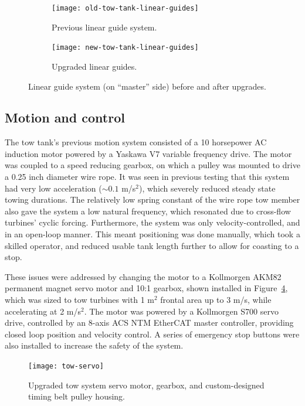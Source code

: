 \begin{figure}
    \centering
    
    \begin{subfigure}{0.47\textwidth}
        \texttt{[image: old-tow-tank-linear-guides]}
        \caption{Previous linear guide system.}
        \label{fig:old-linear-guides}
    \end{subfigure}
    \begin{subfigure}{0.47\textwidth}
        \texttt{[image: new-tow-tank-linear-guides]}
        \caption{Upgraded linear guides.}
        \label{fig:new-linear-guides}
    \end{subfigure}
    
    \caption{Linear guide system (on ``master'' side) before and after
        upgrades.}
\end{figure}


\subsection{Motion and control}

The tow tank's previous motion system consisted of a 10 horsepower AC induction
motor powered by a Yaskawa V7 variable frequency drive. The motor was coupled to
a speed reducing gearbox, on which a pulley was mounted to drive a 0.25 inch
diameter wire rope. It was seen in previous testing that this system had very
low acceleration ($\sim 0.1$ m/s$^2$), which severely reduced steady state
towing durations. The relatively low spring constant of the wire rope tow member
also gave the system a low natural frequency, which resonated due to cross-flow
turbines' cyclic forcing. Furthermore, the system was only velocity-controlled,
and in an open-loop manner. This meant positioning was done manually, which took
a skilled operator, and reduced usable tank length further to allow for coasting
to a stop.

These issues were addressed by changing the motor to a Kollmorgen AKM82
permanent magnet servo motor and 10:1 gearbox, shown installed in
Figure~\ref{fig:tow-servo}, which was sized to tow turbines with 1 m$^2$ frontal
area up to 3 m/s, while accelerating at 2 m/s$^2$. The motor was powered by a
Kollmorgen S700 servo drive, controlled by an 8-axis ACS NTM EtherCAT master
controller, providing closed loop position and velocity control. A series of
emergency stop buttons were also installed to increase the safety of the system.

\begin{figure}
    \centering
    
    \texttt{[image: tow-servo]}
    
    \caption{Upgraded tow system servo motor, gearbox, and custom-designed
        timing belt pulley housing.} 
    
    \label{fig:tow-servo}
\end{figure}

